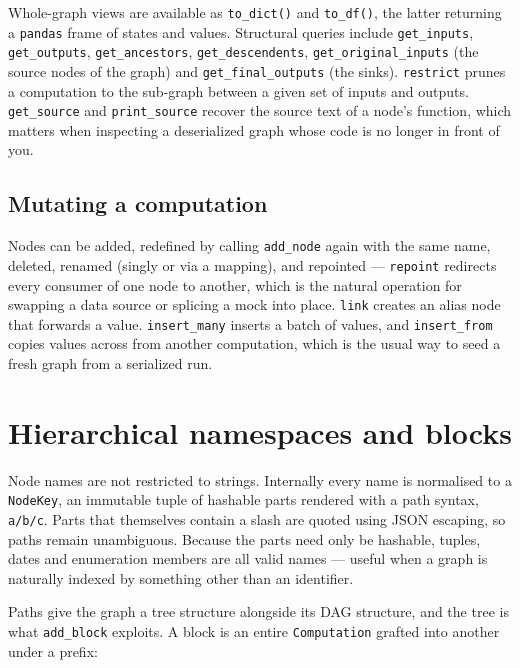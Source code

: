 \documentclass[11pt,a4paper]{article}
\newcommand{\code}[1]{\texttt{#1}}
\begin{document}
Whole-graph views are available as \code{to\_dict()} and \code{to\_df()}, the
latter returning a \code{pandas} \cite{pandas} frame of states and values.
Structural queries include \code{get\_inputs}, \code{get\_outputs},
\code{get\_ancestors}, \code{get\_descendents}, \code{get\_original\_inputs}
(the source nodes of the graph) and \code{get\_final\_outputs} (the sinks).
\code{restrict} prunes a computation to the sub-graph between a given set of
inputs and outputs. \code{get\_source} and \code{print\_source} recover the
source text of a node's function, which matters when inspecting a
deserialized graph whose code is no longer in front of you.

\subsection{Mutating a computation}

Nodes can be added, redefined by calling \code{add\_node} again with the same
name, deleted, renamed (singly or via a mapping), and repointed --- \code{repoint}
redirects every consumer of one node to another, which is the natural operation
for swapping a data source or splicing a mock into place. \code{link} creates
an alias node that forwards a value. \code{insert\_many} inserts a batch of
values, and \code{insert\_from} copies values across from another computation,
which is the usual way to seed a fresh graph from a serialized run.

\section{Hierarchical namespaces and blocks}\label{sec:hierarchy}

Node names are not restricted to strings. Internally every name is normalised
to a \code{NodeKey}, an immutable tuple of hashable parts rendered with a path
syntax, \code{a/b/c}. Parts that themselves contain a slash are quoted using
JSON escaping, so paths remain unambiguous. Because the parts need only be
hashable, tuples, dates and enumeration members are all valid names --- useful
when a graph is naturally indexed by something other than an identifier.

Paths give the graph a tree structure alongside its DAG structure, and the tree
is what \code{add\_block} exploits. A block is an entire \code{Computation}
grafted into another under a prefix:
\end{document}

